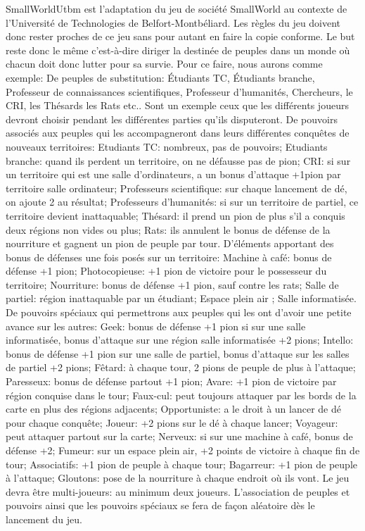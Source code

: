 \documentclass[a4paper, 11pt]{article}
\begin{document}
	SmallWorldUtbm est l'adaptation du jeu de société SmallWorld au contexte de l'Université de Technologies de Belfort-Montbéliard. Les règles du jeu doivent donc rester proches de ce jeu sans pour autant en faire la copie conforme. Le but reste donc le même c'est-à-dire diriger la destinée de peuples dans un monde où chacun doit donc lutter pour sa survie. Pour ce faire, nous aurons comme exemple:
De peuples de substitution: 
Étudiants TC, Étudiants branche, Professeur de connaissances scientifiques, Professeur d’humanités, Chercheurs, le CRI, les Thésards les Rats etc.. Sont un exemple ceux que les différents joueurs devront choisir pendant les différentes parties qu'ils disputeront.
De pouvoirs associés aux peuples qui les accompagneront dans leurs différentes conquêtes de nouveaux territoires: 
Etudiants TC: nombreux, pas de pouvoirs;
Etudiants branche: quand ils perdent un territoire, on ne défausse pas de pion;
CRI: si sur un territoire qui est une salle d’ordinateurs, a un bonus d’attaque +1pion par territoire salle ordinateur;
Professeurs scientifique: sur chaque lancement de dé, on ajoute 2 au résultat;
Professeurs d’humanités: si sur un territoire de partiel, ce territoire devient inattaquable;
Thésard: il prend un pion de plus s’il a conquis deux régions non vides ou plus;
Rats: ils annulent le bonus de défense de la nourriture et gagnent un pion de peuple par tour.
D'éléments apportant des bonus de défenses une fois posés sur un territoire:
Machine à café: bonus de défense +1 pion; 
Photocopieuse: +1 pion de victoire pour le possesseur du territoire;
Nourriture: bonus de défense +1 pion, sauf contre les rats;
Salle de partiel: région inattaquable par un étudiant;
Espace plein air ;
Salle informatisée.
De pouvoirs spéciaux qui permettrons aux peuples qui les ont d'avoir une petite avance sur les autres:
Geek: bonus de défense +1 pion si sur une salle informatisée, bonus d’attaque sur une région salle informatisée +2 pions;
Intello: bonus de défense +1 pion sur une salle de partiel, bonus d’attaque sur les salles de partiel +2 pions;
Fêtard: à chaque tour, 2 pions de peuple de plus à l’attaque;
Paresseux: bonus de défense partout +1 pion;
Avare: +1 pion de victoire par région conquise dans le tour;
Faux-cul: peut toujours attaquer par les bords de la carte en plus des régions adjacents;
Opportuniste: a le droit à un lancer de dé pour chaque conquête;
Joueur: +2 pions sur le dé à chaque lancer;
Voyageur: peut attaquer partout sur la carte;
Nerveux: si sur une machine à café, bonus de défense +2;
Fumeur: sur un espace plein air, +2 points de victoire à chaque fin de tour;
Associatifs: +1 pion de peuple à chaque tour;
Bagarreur: +1 pion de peuple à l’attaque;
Gloutons: pose de la nourriture à chaque endroit où ils vont.
Le jeu devra être multi-joueurs: au minimum deux joueurs. L'association de peuples et pouvoirs ainsi que les pouvoirs spéciaux se fera de façon aléatoire dès le lancement du jeu.



	
\end{document}
